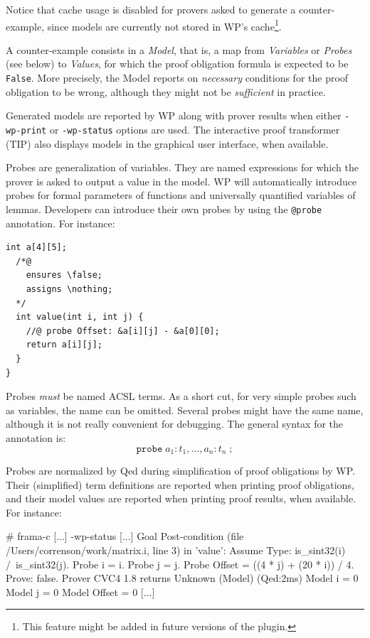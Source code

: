 Notice that cache usage is disabled for provers asked to generate a
counter-example, since models are currently not stored in \textsf{WP}'s
cache\footnote{This feature might be added in future versions of the plugin.}.

A counter-example consists in a \emph{Model}, that is, a map from
\emph{Variables} or \emph{Probes} (see below) to \emph{Values}, for which the
proof obligation formula is expected to be \verb+False+. More precisely, the
Model reports on \emph{necessary} conditions for the proof obligation to be
wrong, although they might not be \emph{sufficient} in practice.

Generated models are reported by \textsf{WP} along with prover results when
either \verb+-wp-print+ or \verb+-wp-status+ options are used. The interactive
proof transformer (\textsf{TIP}) also displays models in the graphical user
interface, when available.

Probes are generalization of variables. They are named expressions for which the
prover is asked to output a value in the model. \textsf{WP} will automatically
introduce probes for formal parameters of functions and universally quantified
variables of lemmas. Developers can introduce their own probes by using the
\verb+@probe+ annotation. For instance:

\begin{lstlisting}[style=c]
  int a[4][5];
  /*@
    ensures \false;
    assigns \nothing;
  */
  int value(int i, int j) {
    //@ probe Offset: &a[i][j] - &a[0][0];
    return a[i][j];
  }
}
\end{lstlisting}

Probes \emph{must} be named \textsf{ACSL} terms.  As a short cut, for very
simple probes such as variables, the name can be omitted. Several probes might
have the same name, although it is not really convenient for debugging. The
general syntax for the annotation is:
\[
\mathtt{probe} \; a_1: t_1, \ldots, a_n: t_n \;\mathtt{;}
\]

Probes are normalized by \textsf{Qed} during simplification of proof obligations
by \textsf{WP}. Their (simplified) term definitions are reported when printing
proof obligations, and their model values are reported when printing proof
results, when available. For instance:

\begin{shell}
  # frama-c [...] -wp-status
  [...]
  Goal Post-condition (file /Users/correnson/work/matrix.i, line 3) in 'value':
  Assume {
    Type: is_sint32(i) /\ is_sint32(j).
    Probe i = i.
    Probe j = j.
    Probe Offset = ((4 * j) + (20 * i)) / 4.
  }
  Prove: false.
  Prover CVC4 1.8 returns Unknown (Model) (Qed:2ms)
  Model i = 0
  Model j = 0
  Model Offset = 0
  [...]
\end{shell}

